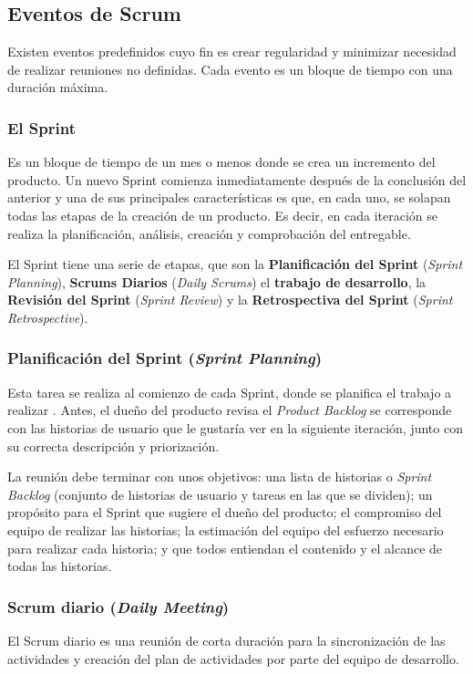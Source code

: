 \subsection{Eventos de Scrum}
Existen eventos \cite{Schwaber2017} predefinidos cuyo fin es crear regularidad y minimizar necesidad de realizar reuniones no definidas. Cada evento es un bloque de tiempo con una duración máxima.

\newpage

\subsubsection{El Sprint}
Es un bloque de tiempo de un mes o menos donde se crea un incremento del producto. Un nuevo Sprint comienza inmediatamente después de la conclusión del anterior y una de sus principales características es que, en cada uno, se solapan todas las etapas de la creación de un producto. Es decir, en cada iteración se realiza la planificación, análisis, creación y comprobación del entregable.

El Sprint tiene una serie de etapas, que son la \textbf{Planificación del Sprint} (\textit{Sprint Planning}), \textbf{Scrums Diarios} (\textit{Daily Scrums}) el \textbf{trabajo de desarrollo}, la \textbf{Revisión del Sprint} (\textit{Sprint Review}) y la \textbf{Retrospectiva del Sprint} (\textit{Sprint Retrospective}).

\subsubsection{Planificación del Sprint (\textit{Sprint Planning})}
Esta tarea se realiza al comienzo de cada Sprint, donde se planifica el trabajo a realizar \cite{Gomez2017}. Antes, el dueño del producto revisa el \textit{Product Backlog} se corresponde con las historias de usuario que le gustaría ver en la siguiente iteración, junto con su correcta descripción y priorización.

La reunión debe terminar con unos objetivos: una lista de historias o \textit{Sprint Backlog} (conjunto de historias de usuario y tareas en las que se dividen); un propósito para el Sprint que sugiere el dueño del producto; el compromiso del equipo de realizar las historias; la estimación del equipo del esfuerzo necesario para realizar cada historia; y que todos entiendan el contenido y el alcance de todas las historias.

\subsubsection{Scrum diario (\textit{Daily Meeting})}
El Scrum diario \cite{Schwaber2017} es una reunión de corta duración para la sincronización de las actividades y creación del plan de actividades por parte del equipo de desarrollo.

